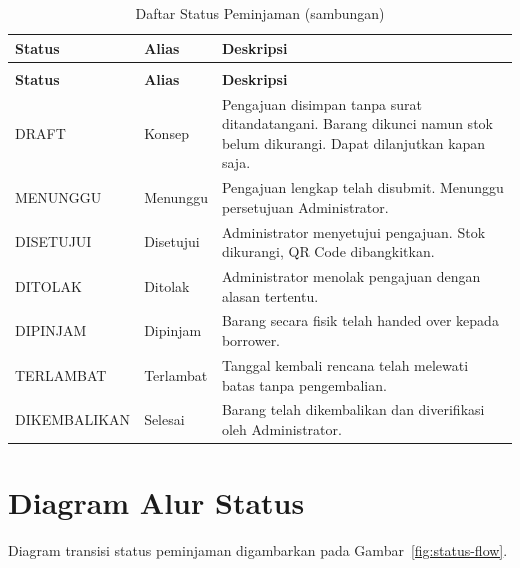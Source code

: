 \documentclass[
  12pt,
  a4paper,
  oneside,
  final
]{report}
\begin{document}
\begin{longtable}[!htbp]{p{3.5cm} p{4cm} p{6cm}}
  \caption{Daftar Status Peminjaman}
  \label{tab:status-peminjaman} \\

  \toprule
  \textbf{Status} & \textbf{Alias} & \textbf{Deskripsi} \\
  \midrule
  \endfirsthead

  \caption[]{Daftar Status Peminjaman (sambungan)} \\
  \toprule
  \textbf{Status} & \textbf{Alias} & \textbf{Deskripsi} \\
  \midrule
  \endhead

  \bottomrule
  \endfoot

  DRAFT           & Konsep      & Pengajuan disimpan tanpa surat
                   ditandatangani. Barang dikunci namun stok belum
                   dikurangi. Dapat dilanjutkan kapan saja. \\[4pt]
  MENUNGGU        & Menunggu    & Pengajuan lengkap telah disubmit.
                   Menunggu persetujuan Administrator. \\[4pt]
  DISETUJUI       & Disetujui   & Administrator menyetujui pengajuan.
                   Stok dikurangi, QR Code dibangkitkan. \\[4pt]
  DITOLAK         & Ditolak     & Administrator menolak pengajuan
                   dengan alasan tertentu. \\[4pt]
  DIPINJAM        & Dipinjam    & Barang secara fisik telah handed over
                   kepada borrower. \\[4pt]
  TERLAMBAT       & Terlambat   & Tanggal kembali rencana telah melewati
                   batas tanpa pengembalian. \\[4pt]
  DIKEMBALIKAN   & Selesai     & Barang telah dikembalikan dan
                   diverifikasi oleh Administrator. \\
\end{longtable}

\section{Diagram Alur Status}

Diagram transisi status peminjaman digambarkan pada
Gambar~\ref{fig:status-flow}.
\end{document}
